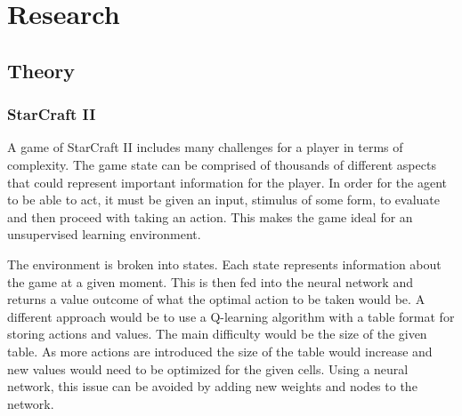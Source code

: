 \chapter{Research}%
\label{research}

\section{Theory}

\subsection{StarCraft II}

A game of StarCraft II includes many challenges for a player in terms of complexity.
The game state can be comprised of thousands of different aspects that could represent
important information for the player. In order for the agent to be able to act,
it must be given an input, stimulus of some form, to evaluate and then proceed with
taking an action. This makes the game ideal for an unsupervised learning environment.

The environment is broken into states. Each state represents information about the game at a given moment.
This is then fed into the neural network and returns a value outcome of what the
optimal action to be taken would be.
A different approach would be to use a Q-learning algorithm with a table format for
storing actions and values.
The main difficulty would be the size of the given table.
As more actions are introduced the size of the table would increase and new values would
need to be optimized for the given cells.
Using a neural network, this issue can be avoided by adding new weights and
nodes to the network.

